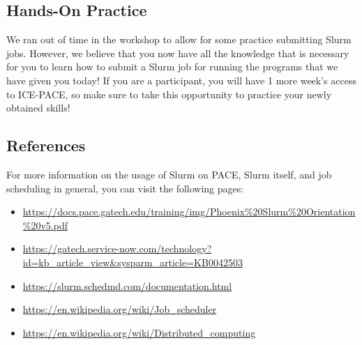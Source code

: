 \documentclass{article}
\begin{document}
\subsection{Hands-On Practice}

We ran out of time in the workshop to allow for some practice submitting Slurm jobs. However, we believe that you now have all the knowledge that is necessary for you to learn how to submit a Slurm job for running the programs that we have given you today! If you are a participant, you will have 1 more week's access to ICE-PACE, so make sure to take this opportunity to practice your newly obtained skills!

\subsection{References}

For more information on the usage of Slurm on PACE, Slurm itself, and job scheduling in general, you can visit the following pages:

\begin{itemize}
    \item \url{https://docs.pace.gatech.edu/training/img/Phoenix%20Slurm%20Orientation%20v5.pdf}
    \item \url{https://gatech.service-now.com/technology?id=kb_article_view&sysparm_article=KB0042503}
    \item \url{https://slurm.schedmd.com/documentation.html}
    \item \url{https://en.wikipedia.org/wiki/Job_scheduler}
    \item \url{https://en.wikipedia.org/wiki/Distributed_computing}
\end{itemize}
\end{document}
